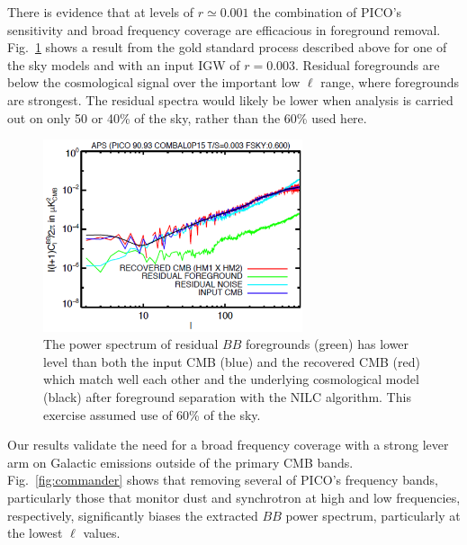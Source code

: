 \documentclass[PICOReport.tex]{subfiles}
\begin{document}
There is evidence that at levels of $r \simeq 0.001$ the combination of PICO's sensitivity and broad frequency coverage are efficacious in foreground removal. Fig.~\ref{fig:nilc} shows a result from the gold standard process described above for one of the sky models and with an input \ac{IGW} of $r=0.003$. Residual foregrounds are below the cosmological signal over the important low $\ell$ range, where foregrounds are strongest. The residual spectra would likely be lower when analysis is carried out on only 50 or 40\% of the sky, rather than the 60\% used here. 

\begin{figure}
\hspace{-0.1in}
\parbox{3.0in}{\centerline {
\includegraphics[width=3.0in]{images/soumen_NILC_foregrounds_93.png}}}
\hspace{0.25in}
\parbox{3.0in}{
\caption{\captiontext
The power spectrum of residual $BB$ foregrounds (green) has lower level than both the input CMB (blue) and the recovered CMB (red) which match well each other and the underlying cosmological model (black) after foreground separation with the NILC algorithm. This exercise assumed use of 60\% of the sky.   
\label{fig:nilc}}}
\vspace{-0.1in}
\end{figure}

Our results validate the need for a broad frequency coverage with a strong lever arm on Galactic emissions outside of the primary CMB bands. Fig.~\ref{fig:commander} shows that removing several of PICO's frequency bands, particularly those that monitor dust and synchrotron at high and low frequencies, respectively, significantly biases the extracted $BB$ power spectrum, particularly at the lowest $\ell$ values. 
\end{document}
